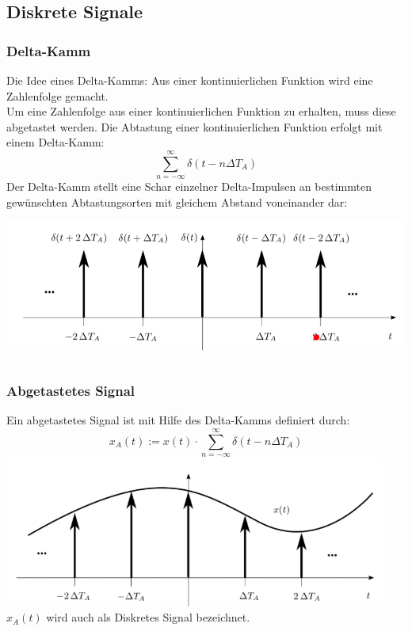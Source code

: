 \documentclass[12pt,a4paper]{scrartcl}
\begin{document}
  \newpage
  \subsection{Diskrete Signale}
  \label{sec:sub:diskrete-signale}

  \subsubsection{Delta-Kamm}
  \label{sec.sub:sub:delta-kamm}
  \noindent Die Idee eines Delta-Kamms: Aus einer kontinuierlichen Funktion wird eine Zahlenfolge gemacht. \\
  
\noindent Um eine Zahlenfolge aus einer kontinuierlichen Funktion zu erhalten, muss diese abgetastet werden. 
Die Abtastung einer kontinuierlichen Funktion erfolgt mit einem Delta-Kamm:
  \begin{equation}
    \label{eq:11}
      \sum_{n = -\infty}^{\infty} \delta (t-n\Delta T_A)
  \end{equation}
\noindent Der Delta-Kamm stellt eine Schar einzelner Delta-Impulsen an bestimmten gewünschten Abtastungsorten mit gleichem Abstand voneinander dar: \\
\includegraphics[height=5cm]{Pictures/DeltaKamm.png}

\subsubsection{Abgetastetes Signal}
  \label{sec.sub:sub:abgetastetes-signal}
\noindent Ein abgetastetes Signal ist mit Hilfe des Delta-Kamms definiert durch:
\begin{equation}
  \label{eq:12}
    x_A(t) := x(t) \cdot \sum_{n = -\infty}^{\infty} \delta (t-n\Delta T_A)
\end{equation} 
\includegraphics[height=5cm]{Pictures/AbgetastetSignal.png} \\
\noindent $x_A(t)$ wird auch als Diskretes Signal bezeichnet.
\end{document}
